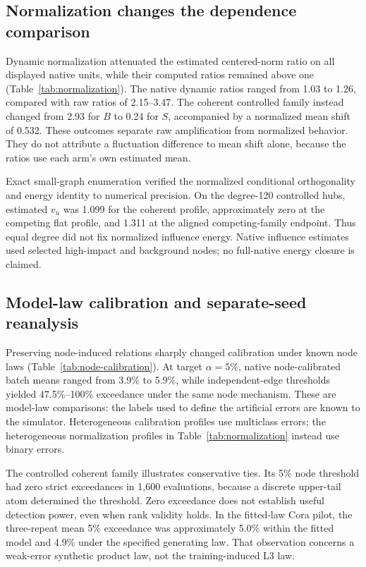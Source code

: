 \subsection{Normalization changes the dependence comparison}
Dynamic normalization attenuated the estimated centered-norm ratio on
all displayed native units, while their computed ratios remained above
one (Table~\ref{tab:normalization}). The native dynamic ratios ranged
from 1.03 to 1.26, compared with raw ratios of 2.15--3.47.
The coherent controlled family instead changed from 2.93 for $B$ to
0.24 for $S$, accompanied by a normalized mean shift of 0.532.
These outcomes separate raw amplification from normalized behavior.
They do not attribute a fluctuation difference to mean shift alone,
because the ratios use each arm's own estimated mean.



Exact small-graph enumeration verified the normalized conditional
orthogonality and energy identity to numerical precision. On the
degree-120 controlled hubs, estimated $v_u$ was 1.099 for the coherent
profile, approximately zero at the competing flat profile, and 1.311
at the aligned competing-family endpoint. Thus equal degree did not
fix normalized influence energy. Native influence estimates used
selected high-impact and background nodes; no full-native energy
closure is claimed.

\subsection{Model-law calibration and separate-seed reanalysis}
Preserving node-induced relations sharply changed calibration under
known node laws (Table~\ref{tab:node-calibration}). At target $\alpha=5\%$,
native node-calibrated batch means ranged from 3.9\% to 5.9\%, while
independent-edge thresholds yielded 47.5\%--100\% exceedance under the
same node mechanism. These are model-law comparisons: the labels used
to define the artificial errors are known to the simulator. Heterogeneous
calibration profiles use multiclass errors; the heterogeneous normalization
profiles in Table~\ref{tab:normalization} instead use binary errors.



The controlled coherent family illustrates conservative ties. Its
5\% node threshold had zero strict exceedances in 1,600 evaluations,
because a discrete upper-tail atom determined the threshold. Zero
exceedance does not establish useful detection power, even when rank
validity holds. In the fitted-law Cora pilot, the three-repeat mean
5\% exceedance was approximately 5.0\% within the fitted model and
4.9\% under the specified generating law. That observation concerns
a weak-error synthetic product law, not the training-induced L3 law.

